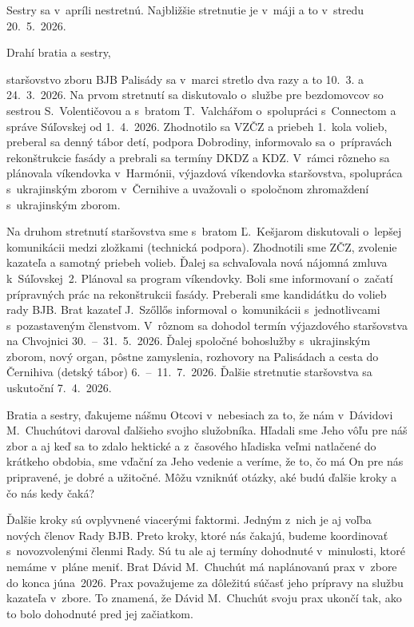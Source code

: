 Sestry sa v~apríli nestretnú. Najbližšie stretnutie je v~máji a to v~stredu 20.~5.~2026.
\vfill\break




Drahí bratia a sestry,

staršovstvo zboru BJB Palisády sa v~marci stretlo dva razy a to 10.~3. a 24.~3.~2026. Na prvom stretnutí sa diskutovalo o~službe pre bezdomovcov so sestrou S.~Volentičovou a s~bratom T.~Valchářom o~spolupráci s~Connectom a správe Súľovskej od 1.~4.~2026. Zhodnotilo sa VZČZ a priebeh 1.~kola volieb, preberal sa denný tábor detí, podpora Dobrodiny, informovalo sa o~prípravách rekonštrukcie fasády a prebrali sa termíny DKDZ a KDZ. V~rámci rôzneho sa plánovala víkendovka v~Harmónii, výjazdová víkendovka staršovstva, spolupráca s~ukrajinským zborom v~Černihive a uvažovali o~spoločnom zhromaždení s~ukrajinským zborom.

Na druhom stretnutí staršovstva sme s~bratom Ľ.~Kešjarom diskutovali o~lepšej komunikácii medzi zložkami (technická podpora). Zhodnotili sme ZČZ, zvolenie kazateľa a samotný priebeh volieb. Ďalej sa schvaľovala nová nájomná zmluva k~Súľovskej~2. Plánoval sa program víkendovky. Boli sme informovaní o~začatí prípravných prác na rekonštrukcii fasády. Preberali sme kandidátku do volieb rady BJB. Brat kazateľ J.~Szőllős informoval o~komunikácii s~jednotlivcami s~pozastaveným členstvom. V~rôznom sa dohodol termín výjazdového staršovstva na Chvojnici 30.~--~31.~5.~2026. Ďalej spoločné bohoslužby s~ukrajinským zborom, nový organ, pôstne zamyslenia, rozhovory na Palisádach a cesta do Černihiva (detský tábor) 6.~--~11.~7.~2026.
Ďalšie stretnutie staršovstva sa uskutoční 7.~4.~2026.


Bratia a sestry, ďakujeme nášmu Otcovi v~nebesiach za to, že nám v~Dávidovi M.~Chuchútovi daroval ďalšieho svojho služobníka. Hľadali sme Jeho vôľu pre náš zbor a aj keď sa to zdalo hektické a z~časového hľadiska veľmi natlačené do krátkeho obdobia, sme vďační za Jeho vedenie a veríme, že to, čo má On pre nás pripravené, je dobré a užitočné.
Môžu vzniknúť otázky, aké budú ďalšie kroky a čo nás kedy čaká?

Ďalšie kroky sú ovplyvnené viacerými faktormi. Jedným z~nich je aj voľba nových členov Rady BJB. Preto kroky, ktoré nás čakajú, budeme koordinovať s~novozvolenými členmi Rady.
Sú tu ale aj termíny dohodnuté v~minulosti, ktoré nemáme v~pláne meniť. Brat Dávid M.~Chuchút má naplánovanú prax v~zbore do konca júna~2026. Prax považujeme za dôležitú súčasť jeho prípravy na službu kazateľa v~zbore. To znamená, že Dávid M.~Chuchút svoju prax ukončí tak, ako to bolo dohodnuté pred jej začiatkom.

